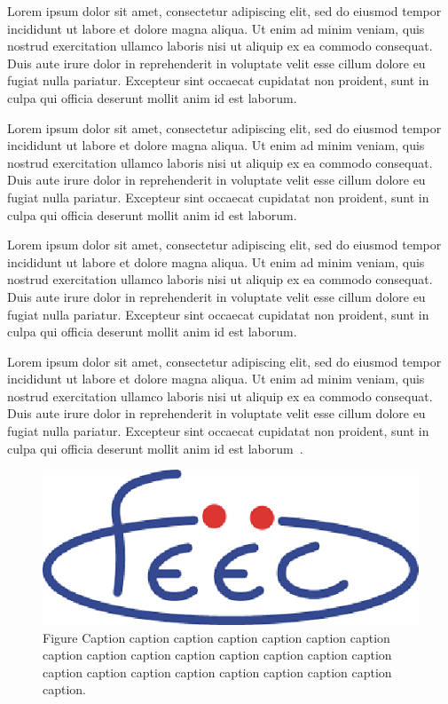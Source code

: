 \documentclass[Ingles]{feec-tese-v1}
\begin{document}
Lorem ipsum dolor sit amet, consectetur adipiscing elit, sed do eiusmod
tempor incididunt ut labore et dolore magna aliqua. Ut enim ad minim
veniam, quis nostrud exercitation ullamco laboris nisi ut aliquip ex ea
commodo consequat. Duis aute irure dolor in reprehenderit in voluptate
velit esse cillum dolore eu fugiat nulla pariatur. Excepteur sint occaecat
cupidatat non proident, sunt in culpa qui officia deserunt mollit anim id
est laborum.

Lorem ipsum dolor sit amet, consectetur adipiscing elit, sed do eiusmod
tempor incididunt ut labore et dolore magna aliqua. Ut enim ad minim
veniam, quis nostrud exercitation ullamco laboris nisi ut aliquip ex ea
commodo consequat. Duis aute irure dolor in reprehenderit in voluptate
velit esse cillum dolore eu fugiat nulla pariatur. Excepteur sint occaecat
cupidatat non proident, sunt in culpa qui officia deserunt mollit anim id
est laborum.

Lorem ipsum dolor sit amet, consectetur adipiscing elit, sed do eiusmod
tempor incididunt ut labore et dolore magna aliqua. Ut enim ad minim
veniam, quis nostrud exercitation ullamco laboris nisi ut aliquip ex ea
commodo consequat. Duis aute irure dolor in reprehenderit in voluptate
velit esse cillum dolore eu fugiat nulla pariatur. Excepteur sint occaecat
cupidatat non proident, sunt in culpa qui officia deserunt mollit anim id
est laborum.

Lorem ipsum dolor sit amet, consectetur adipiscing elit, sed do eiusmod
tempor incididunt ut labore et dolore magna aliqua. Ut enim ad minim
veniam, quis nostrud exercitation ullamco laboris nisi ut aliquip ex ea
commodo consequat. Duis aute irure dolor in reprehenderit in voluptate
velit esse cillum dolore eu fugiat nulla pariatur. Excepteur sint occaecat
cupidatat non proident, sunt in culpa qui officia deserunt mollit anim id
est laborum~\cite{2014-bic,2015-ela}.

\begin{figure}
\centerline{\includegraphics[scale=1]{logo-feec.eps}}
\caption[Shorter figure caption]{Figure Caption caption caption caption
  caption caption caption caption caption caption caption caption caption
  caption caption caption caption caption caption caption caption caption
  caption caption.}
\label{f:label1}
\end{figure}
\end{document}
